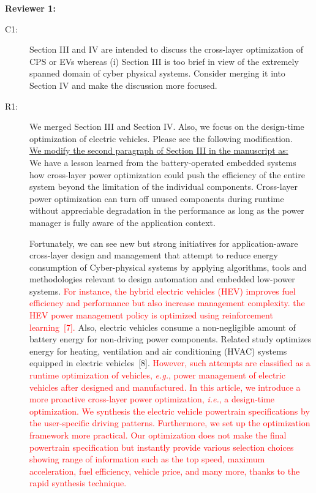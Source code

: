 \documentclass[onecolumn]{IEEEconf}
\begin{document}
\setlength{\parindent}{0cm}
\textbf{Reviewer 1:}
\begin{description}
\item [C1: ] Section III and IV are intended to discuss the cross-layer optimization of CPS or EVs whereas (i) Section III is too brief in view of the extremely spanned domain of cyber physical systems. Consider merging it into Section IV and make the discussion more focused.  
\item [R1: ] We merged Section III and Section IV. Also, we focus on the design-time optimization of electric vehicles. Please see the following modification.\\

\underline{We modify the second paragraph of Section III in the manuscript as:}\\
We have a lesson learned from the battery-operated embedded systems how cross-layer power optimization could push the efficiency of the entire system beyond the limitation of the individual components. Cross-layer power optimization can turn off unused components during runtime without appreciable degradation in the performance as long as the power manager is fully aware of the application context. 

Fortunately, we can see new but strong initiatives for application-aware cross-layer design and management that attempt to reduce energy consumption of Cyber-physical systems by applying algorithms, tools and methodologies relevant to design automation and embedded low-power systems.
\textcolor{red}{For instance, the hybrid electric vehicles (HEV) improves fuel efficiency and performance but also increase management complexity. the HEV power management policy is optimized using reinforcement learning~[7].}
Also, electric vehicles consume a non-negligible amount of battery energy for non-driving power components. Related study optimizes energy for heating, ventilation and air conditioning (HVAC) systems equipped in electric vehicles~[8].
\textcolor{red}{However, such attempts are classified as a runtime optimization of vehicles, \textit{e.g.}, power management of electric vehicles after designed and manufactured. In this article, we introduce a more proactive cross-layer power optimization, \textit{i.e.}, a design-time optimization. We synthesis the electric vehicle powertrain specifications by the user-specific driving patterns. Furthermore, we set up the optimization framework more practical. Our optimization does not make the final powertrain specification but instantly provide various selection choices showing range of information such as the top speed, maximum acceleration, fuel efficiency, vehicle price, and many more, thanks to the rapid synthesis technique.}\\
~\\


\end{description}
\end{document}
